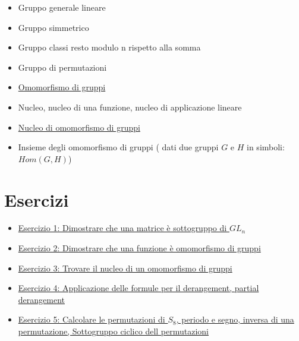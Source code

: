 \documentclass[a4paper,10pt]{article}
\begin{document}
\begin{itemize}
 \item Gruppo generale lineare
 \item Gruppo simmetrico 
 \item Gruppo classi resto modulo n rispetto alla somma
 \item Gruppo di permutazioni
 
 \item \href{./OmomorfismoGruppi.html}{Omomorfismo di gruppi}
 \item Nucleo, nucleo di una funzione, nucleo di applicazione lineare
 \item \href{./Nucleo.html}{Nucleo di omomorfismo di gruppi}
 \item Insieme degli omomorfismo di gruppi ( dati due gruppi $G$ e $H$ in simboli: $Hom(G,H)$)
 
\end{itemize}

\section{Esercizi}
\begin{itemize}
 \item \href{./esercizio1.html}{Esercizio 1: Dimostrare che una matrice è sottogruppo di $GL_{n}$}
 \item \href{./esercizio2.html}{Esercizio 2: Dimostrare che una funzione è omomorfismo di gruppi}
 \item \href{./esercizio3.html}{Esercizio 3: Trovare il nucleo di un omomorfismo di gruppi}
 \item \href{./esercizio4.html}{Esercizio 4: Applicazione delle formule per il derangement, partial derangement}
 \item \href{./esercizio5.html}{Esercizio 5: Calcolare le permutazioni di $S_{8}$, periodo e segno, inversa di una permutazione, Sottogruppo ciclico dell permutazioni}
\end{itemize}
\end{document}
